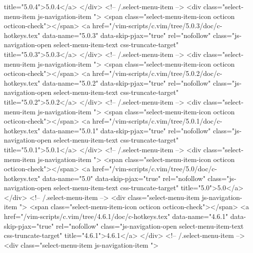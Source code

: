                  title="5.0.4">5.0.4</a>
            </div> <!-- /.select-menu-item -->
            <div class="select-menu-item js-navigation-item ">
              <span class="select-menu-item-icon octicon octicon-check"></span>
              <a href="/vim-scripts/c.vim/tree/5.0.3/doc/c-hotkeys.tex"
                 data-name="5.0.3"
                 data-skip-pjax="true"
                 rel="nofollow"
                 class="js-navigation-open select-menu-item-text css-truncate-target"
                 title="5.0.3">5.0.3</a>
            </div> <!-- /.select-menu-item -->
            <div class="select-menu-item js-navigation-item ">
              <span class="select-menu-item-icon octicon octicon-check"></span>
              <a href="/vim-scripts/c.vim/tree/5.0.2/doc/c-hotkeys.tex"
                 data-name="5.0.2"
                 data-skip-pjax="true"
                 rel="nofollow"
                 class="js-navigation-open select-menu-item-text css-truncate-target"
                 title="5.0.2">5.0.2</a>
            </div> <!-- /.select-menu-item -->
            <div class="select-menu-item js-navigation-item ">
              <span class="select-menu-item-icon octicon octicon-check"></span>
              <a href="/vim-scripts/c.vim/tree/5.0.1/doc/c-hotkeys.tex"
                 data-name="5.0.1"
                 data-skip-pjax="true"
                 rel="nofollow"
                 class="js-navigation-open select-menu-item-text css-truncate-target"
                 title="5.0.1">5.0.1</a>
            </div> <!-- /.select-menu-item -->
            <div class="select-menu-item js-navigation-item ">
              <span class="select-menu-item-icon octicon octicon-check"></span>
              <a href="/vim-scripts/c.vim/tree/5.0/doc/c-hotkeys.tex"
                 data-name="5.0"
                 data-skip-pjax="true"
                 rel="nofollow"
                 class="js-navigation-open select-menu-item-text css-truncate-target"
                 title="5.0">5.0</a>
            </div> <!-- /.select-menu-item -->
            <div class="select-menu-item js-navigation-item ">
              <span class="select-menu-item-icon octicon octicon-check"></span>
              <a href="/vim-scripts/c.vim/tree/4.6.1/doc/c-hotkeys.tex"
                 data-name="4.6.1"
                 data-skip-pjax="true"
                 rel="nofollow"
                 class="js-navigation-open select-menu-item-text css-truncate-target"
                 title="4.6.1">4.6.1</a>
            </div> <!-- /.select-menu-item -->
            <div class="select-menu-item js-navigation-item ">
